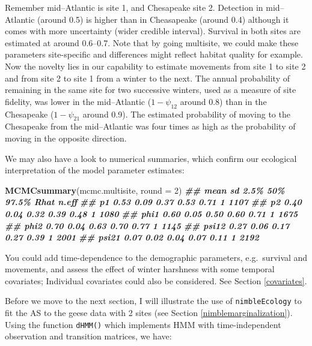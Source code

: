 \documentclass[
  12pt,
]{krantz}
\newenvironment{Shaded}{\begin{snugshade}}{\end{snugshade}}
\newcommand{\AttributeTok}[1]{\textcolor[rgb]{0.13,0.29,0.53}{#1}}
\newcommand{\DecValTok}[1]{\textcolor[rgb]{0.00,0.00,0.81}{#1}}
\newcommand{\DocumentationTok}[1]{\textcolor[rgb]{0.56,0.35,0.01}{\textbf{\textit{#1}}}}
\newcommand{\FunctionTok}[1]{\textcolor[rgb]{0.13,0.29,0.53}{\textbf{#1}}}
\newcommand{\NormalTok}[1]{#1}
\begin{document}
Remember mid--Atlantic is site 1, and Chesapeake site 2. Detection in mid--Atlantic (around 0.5) is higher than in Cheasapeake (around 0.4) although it comes with more uncertainty (wider credible interval). Survival in both sites are estimated at around 0.6--0.7. Note that by going multisite, we could make these parameters site-specific and differences might reflect habitat quality for example. Now the novelty lies in our capability to estimate movements from site 1 to site 2 and from site 2 to site 1 from a winter to the next. The annual probability of remaining in the same site for two successive winters, used as a measure of site fidelity, was lower in the mid--Atlantic (\(1-\psi_{12}\) around 0.8) than in the Chesapeake (\(1-\psi_{21}\) around 0.9). The estimated probability of moving to the Chesapeake from the mid--Atlantic was four times as high as the probability of moving in the opposite direction.

We may also have a look to numerical summaries, which confirm our ecological interpretation of the model parameter estimates:

\begin{Shaded}
\begin{Highlighting}[]
\FunctionTok{MCMCsummary}\NormalTok{(mcmc.multisite, }\AttributeTok{round =} \DecValTok{2}\NormalTok{)}
\DocumentationTok{\#\#       mean   sd 2.5\%  50\% 97.5\% Rhat n.eff}
\DocumentationTok{\#\# p1    0.53 0.09 0.37 0.53  0.71    1  1107}
\DocumentationTok{\#\# p2    0.40 0.04 0.32 0.39  0.48    1  1080}
\DocumentationTok{\#\# phi1  0.60 0.05 0.50 0.60  0.71    1  1675}
\DocumentationTok{\#\# phi2  0.70 0.04 0.63 0.70  0.77    1  1145}
\DocumentationTok{\#\# psi12 0.27 0.06 0.17 0.27  0.39    1  2001}
\DocumentationTok{\#\# psi21 0.07 0.02 0.04 0.07  0.11    1  2192}
\end{Highlighting}
\end{Shaded}

You could add time-dependence to the demographic parameters, e.g.~survival and movements, and assess the effect of winter harshness with some temporal covariates; Individual covariates could also be considered. See Section \ref{covariates}.

Before we move to the next section, I will illustrate the use of \texttt{nimbleEcology} to fit the AS to the geese data with 2 sites (see Section \ref{nimblemarginalization}). Using the function \texttt{dHMM()} which implements HMM with time-independent observation and transition matrices, we have:
\end{document}
